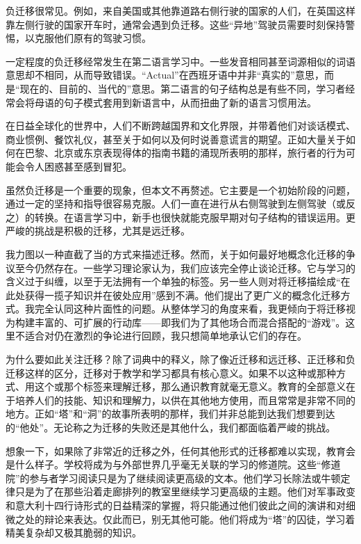 负迁移很常见。例如，来自美国或其他靠道路右侧行驶的国家的人们，在英国这样靠左侧行驶的国家开车时，通常会遇到负迁移。这些“异地”驾驶员需要时刻保持警惕，以克服他们原有的驾驶习惯。

一定程度的负迁移经常发生在第二语言学习中。一些发音相同甚至词源相似的词语意思却不相同，从而导致错误。“Actual”在西班牙语中并非“真实的”意思，而是“现在的、目前的、当代的”意思。第二语言的句子结构总是有些不同，学习者经常会将母语的句子模式套用到新语言中，从而扭曲了新的语言习惯用法。

在日益全球化的世界中，人们不断跨越国界和文化界限，并带着他们对谈话模式、商业惯例、餐饮礼仪，甚至关于如何以及何时说善意谎言的期望。正如大量关于如何在巴黎、北京或东京表现得体的指南书籍的涌现所表明的那样，旅行者的行为可能会令人困惑甚至感到冒犯。

虽然负迁移是一个重要的现象，但本文不再赘述。它主要是一个初始阶段的问题，通过一定的坚持和指导很容易克服。人们一直在进行从右侧驾驶到左侧驾驶（或反之）的转换。在语言学习中，新手也很快就能克服早期对句子结构的错误运用。更严峻的挑战是积极的迁移，尤其是远迁移。

我力图以一种直截了当的方式来描述迁移。然而，关于如何最好地概念化迁移的争议至今仍然存在。一些学习理论家认为，我们应该完全停止谈论迁移。它与学习的含义过于纠缠，以至于无法拥有一个单独的标签。另一些人则对将迁移描绘成“在此处获得一揽子知识并在彼处应用”感到不满。他们提出了更广义的概念化迁移方式。我完全认同这种片面性的问题。从整体学习的角度来看，我更倾向于将迁移视为构建丰富的、可扩展的行动库——即我们为了其他场合而混合搭配的“游戏”。这里不适合对仍在激烈的争论进行回顾，我只想简单地承认它们的存在。

为什么要如此关注迁移？除了词典中的释义，除了像近迁移和远迁移、正迁移和负迁移这样的区分，迁移对于教学和学习都具有核心意义。如果不以这种或那种方式、用这个或那个标签来理解迁移，那么通识教育就毫无意义。教育的全部意义在于培养人们的技能、知识和理解力，以供在其他地方使用，而且常常是非常不同的地方。正如“塔”和“洞”的故事所表明的那样，我们并非总能到达我们想要到达的“他处”。无论称之为迁移的失败还是其他什么，我们都面临着严峻的挑战。

想象一下，如果除了非常近的迁移之外，任何其他形式的迁移都难以实现，教育会是什么样子。学校将成为与外部世界几乎毫无关联的学习的修道院。这些“修道院”的参与者学习阅读只是为了继续阅读更高级的文本。他们学习长除法或牛顿定律只是为了在那些沿着走廊排列的教室里继续学习更高级的主题。他们对军事政变和意大利十四行诗形式的日益精深的掌握，将只能通过他们彼此之间的演讲和对细微之处的辩论来表达。仅此而已，别无其他可能。他们将成为“塔”的囚徒，学习着精美复杂却又极其脆弱的知识。


